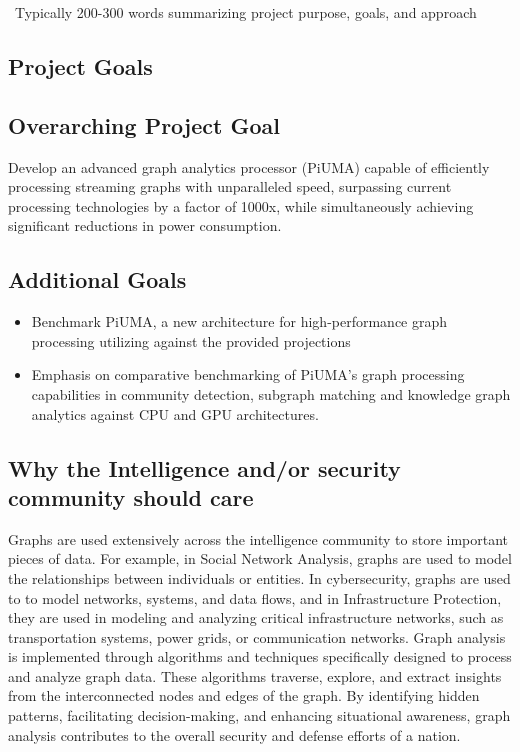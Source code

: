 \documentclass[letterpaper, 10pt]{article}
\begin{document}
\abstractname{~Typically 200-300 words summarizing project purpose, goals, and approach~}
\begin{multicols}{2}    
    \section{Project Goals}
        \subsection{Overarching Project Goal}
        Develop an advanced graph analytics processor (PiUMA) capable of efficiently processing streaming graphs with unparalleled speed, surpassing current processing technologies by a factor of 1000x, while simultaneously achieving significant reductions in power consumption. 
        \subsection{Additional Goals}
        \begin{itemize}
        \item Benchmark PiUMA, a new architecture for high-performance graph processing utilizing against the provided projections 
        \item Emphasis on comparative benchmarking of PiUMA’s graph processing capabilities in community detection, subgraph matching and knowledge graph analytics against CPU and GPU architectures.
        \end{itemize}

        \subsection{Why the Intelligence and/or security community should care}
        Graphs are used extensively across the intelligence community to store important pieces of data. For example, in Social Network Analysis, graphs are used to model the relationships between individuals or entities. In cybersecurity, graphs are used to to model networks, systems, and data flows, and in Infrastructure Protection, they are used in modeling and analyzing critical infrastructure networks, such as transportation systems, power grids, or communication networks. 
        Graph analysis is implemented through algorithms and techniques specifically designed to process and analyze graph data. These algorithms traverse, explore, and extract insights from the interconnected nodes and edges of the graph. By identifying hidden patterns, facilitating decision-making, and enhancing situational awareness, graph analysis contributes to the overall security and defense efforts of a nation. 
        

\end{multicols}
\end{document}
